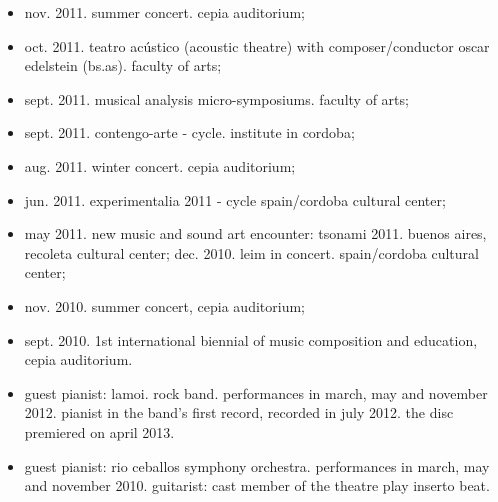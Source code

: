 \documentclass{book}
\begin{document}
\begin{itemize}
\item nov. 2011. summer concert. cepia auditorium;
\item oct. 2011. teatro acústico (acoustic theatre) with composer/conductor oscar edelstein (bs.as). faculty of arts;
\item sept. 2011. musical analysis micro-symposiums. faculty of arts;
\item sept. 2011. contengo-arte - cycle. institute in cordoba;
\item aug. 2011. winter concert. cepia auditorium;
\item jun. 2011. experimentalia 2011 - cycle spain/cordoba cultural center;
\item may 2011. new music and sound art encounter: tsonami 2011. buenos aires, recoleta cultural center; dec. 2010. leim in concert. spain/cordoba cultural center;
\item nov. 2010. summer concert, cepia auditorium;
\item sept. 2010. 1st international biennial of music composition and education, cepia auditorium.
\item guest pianist: lamoi. rock band. performances in march, may and november 2012. pianist in the band’s first record, recorded in july 2012. the disc premiered on april 2013.
\item guest pianist: rio ceballos symphony orchestra. performances in march, may and november 2010. guitarist: cast member of the theatre play inserto beat.
\end{itemize}

\tableofcontents
\end{document}
